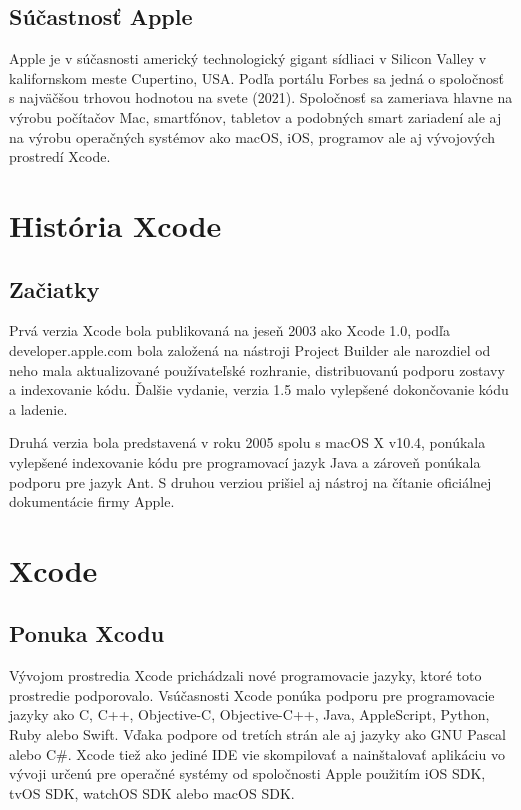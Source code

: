 \documentclass{article}
\begin{document}
\subsection{Súčastnosť Apple}
Apple je v súčasnosti americký technologický gigant sídliaci v Silicon Valley v kalifornskom meste Cupertino,  USA.  Podľa portálu Forbes sa jedná o spoločnosť s najväčšou trhovou hodnotou na svete (2021).  Spoločnosť sa zameriava hlavne na výrobu počítačov Mac,  smartfónov,  tabletov a podobných smart zariadení ale aj na výrobu operačných systémov ako macOS,  iOS,  programov ale aj vývojových prostredí Xcode.

\newpage
\section{História Xcode}
\subsection{Začiatky}
Prvá verzia Xcode bola publikovaná na jeseň 2003 ako Xcode 1.0,  podľa developer.apple.com bola založená na nástroji Project Builder ale narozdiel od neho mala aktualizované používateľské rozhranie,  distribuovanú podporu zostavy a indexovanie kódu.  Ďalšie vydanie,  verzia 1.5 malo vylepšené dokončovanie kódu a ladenie.  \par
Druhá verzia bola predstavená v roku 2005 spolu s macOS X v10.4,  ponúkala vylepšené indexovanie kódu pre programovací jazyk Java a zároveň ponúkala podporu pre jazyk Ant.  S druhou verziou prišiel aj nástroj na čítanie oficiálnej dokumentácie firmy Apple.

\newpage
\section{Xcode}
\subsection{Ponuka Xcodu}
Vývojom prostredia Xcode prichádzali nové programovacie jazyky,  ktoré toto prostredie podporovalo.  Vsúčasnosti Xcode ponúka podporu pre programovacie jazyky ako C,  C++,  Objective-C,  Objective-C++,  Java,  AppleScript,  Python,  Ruby alebo Swift.  Vďaka podpore od tretích strán ale aj jazyky ako GNU Pascal alebo C\#.  Xcode tiež ako jediné IDE vie skompilovať a nainštalovať aplikáciu vo vývoji určenú pre operačné systémy od spoločnosti Apple použitím iOS SDK,  tvOS SDK,  watchOS SDK alebo macOS SDK.
\end{document}

